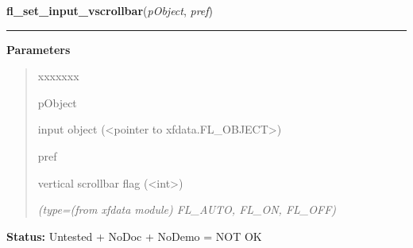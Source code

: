 \hspace{.8\funcindent}\begin{boxedminipage}{\funcwidth}

    \raggedright \textbf{fl\_set\_input\_vscrollbar}(\textit{pObject}, \textit{pref})

    \vspace{-1.5ex}

    \rule{\textwidth}{0.5\fboxrule}
\setlength{\parskip}{2ex}
\setlength{\parskip}{1ex}
      \textbf{Parameters}
      \vspace{-1ex}

      \begin{quote}
        \begin{Ventry}{xxxxxxx}

          \item[pObject]

          input object ({\textless}pointer to 
          xfdata.FL\_OBJECT{\textgreater})

          \item[pref]

          vertical scrollbar flag ({\textless}int{\textgreater})

            {\it (type=(from xfdata module) FL\_AUTO, FL\_ON, FL\_OFF)}

        \end{Ventry}

      \end{quote}

\textbf{Status:} Untested + NoDoc + NoDemo = NOT OK



    \end{boxedminipage}

    \label{xformslib:library:fl_set_input_topline}

    \vspace{0.5ex}

